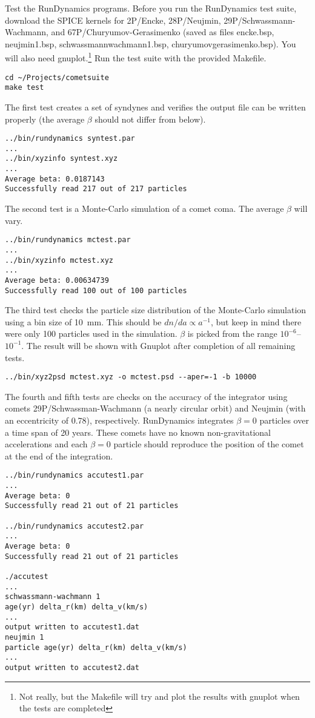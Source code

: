 \documentclass[12pt,letterpaper]{article}
\newcommand\rundynamics{RunDynamics}
\begin{document}
Test the \rundynamics{} programs.  Before you run the \rundynamics{}
test suite, download the SPICE kernels for 2P/Encke, 28P/Neujmin,
29P/Schwassmann-Wachmann, and 67P/Churyumov-Gerasimenko (saved as
files encke.bsp, neujmin1.bsp, schwassmannwachmann1.bsp,
churyumovgerasimenko.bsp).  You will also need gnuplot.\footnote{Not
  really, but the Makefile will try and plot the results with gnuplot
  when the tests are completed} Run the test suite with the provided
Makefile.
\begin{lstlisting}
cd ~/Projects/cometsuite
make test
\end{lstlisting}

The first test creates a set of syndynes and verifies the output file
can be written properly (the average $\beta$ should not differ from
below).
\begin{lstlisting}
../bin/rundynamics syntest.par
...
../bin/xyzinfo syntest.xyz
...
Average beta: 0.0187143
Successfully read 217 out of 217 particles
\end{lstlisting}

The second test is a Monte-Carlo simulation of a comet coma.  The
average $\beta$ will vary.
\begin{lstlisting}
../bin/rundynamics mctest.par
...
../bin/xyzinfo mctest.xyz
...
Average beta: 0.00634739
Successfully read 100 out of 100 particles
\end{lstlisting}

The third test checks the particle size distribution of the
Monte-Carlo simulation using a bin size of 10~mm.  This should be
$dn/da \propto a^{-1}$, but keep in mind there were only 100 particles
used in the simulation.  $\beta$ is picked from the range
$10^{-6}$--$10^{-1}$.  The result will be shown with Gnuplot after
completion of all remaining tests.
\begin{lstlisting}
../bin/xyz2psd mctest.xyz -o mctest.psd --aper=-1 -b 10000
\end{lstlisting}

The fourth and fifth tests are checks on the accuracy of the
integrator using comets 29P/Schwassman-Wachmann (a nearly circular
orbit) and Neujmin (with an eccentricity of 0.78), respectively.
\rundynamics{} integrates $\beta = 0$ particles over a time span of 20
years.  These comets have no known non-gravitational accelerations and
each $\beta = 0$ particle should reproduce the position of the comet
at the end of the integration.
\begin{lstlisting}
../bin/rundynamics accutest1.par
...
Average beta: 0
Successfully read 21 out of 21 particles

../bin/rundynamics accutest2.par
...
Average beta: 0
Successfully read 21 out of 21 particles

./accutest
...
schwassmann-wachmann 1
age(yr) delta_r(km) delta_v(km/s)
...
output written to accutest1.dat
neujmin 1
particle age(yr) delta_r(km) delta_v(km/s)
...
output written to accutest2.dat
\end{lstlisting}
\end{document}
